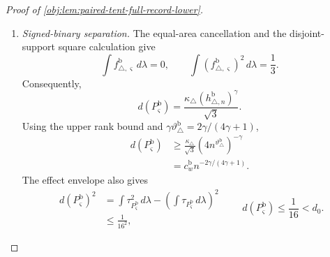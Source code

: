 \begin{proof}[Proof of \cref{obj:lem:paired-tent-full-record-lower}]
\begin{enumerate}
\item \emph{Signed-binary separation.}
The equal-area cancellation and the disjoint-support square calculation give
\[
\int f_{\triangle,\varsigma}^{\mathrm b}\,d\lambda=0,
\qquad
\int(f_{\triangle,\varsigma}^{\mathrm b})^2\,d\lambda=\frac13.
\]
Consequently,
\[
d(P_\varsigma^{\mathrm b})
=\frac{\kappa_\triangle(h_{\triangle,n}^{\mathrm b})^\gamma}{\sqrt3}.
\]
Using the upper rank bound and
\(\gamma\vartheta_\triangle^{\mathrm b}=2\gamma/(4\gamma+1)\),
\[
\begin{aligned}
d(P_\varsigma^{\mathrm b})
&\ge
\frac{\kappa_\triangle}{\sqrt3}
(4n^{\vartheta_\triangle^{\mathrm b}})^{-\gamma}\\
&=
c_w^{\mathrm b}n^{-2\gamma/(4\gamma+1)}.
\end{aligned}
\]
The effect envelope also gives
\[
\begin{aligned}
d(P_\varsigma^{\mathrm b})^2
&=
\int\tau_{P_\varsigma^{\mathrm b}}^2\,d\lambda
-\left(\int\tau_{P_\varsigma^{\mathrm b}}\,d\lambda\right)^2\\
&\le\frac1{16^2},
\end{aligned}
\qquad
d(P_\varsigma^{\mathrm b})\le\frac1{16}<d_0.
\]


\end{enumerate}
\end{proof}
